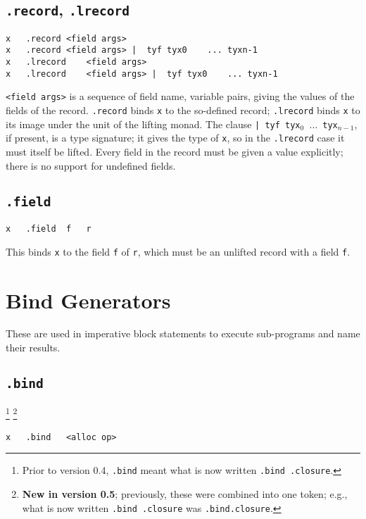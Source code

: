 \documentclass{report}
\newcommand\stringcode[1]{\texttt{#1}}
\newcommand\old[2]{\footnote{Prior to version #1, #2}}
\newcommand\new[2]{\footnote{\textbf{New in version #1}; previously, #2}}
\begin{document}
\subsection{\stringcode{.record}, \stringcode{.lrecord}}

\begin{verbatim}
x	.record	<field args>
x	.record	<field args> |	tyf	tyx0	...	tyxn-1
x	.lrecord	<field args>
x	.lrecord	<field args> |	tyf	tyx0	...	tyxn-1
\end{verbatim}

\stringcode{<field args>} is a sequence of field name, variable pairs, giving the values of the fields of the record.
\stringcode{.record} binds \stringcode{x} to the so-defined record;
\stringcode{.lrecord} binds \stringcode{x} to its image under the unit of the lifting monad.
The clause \stringcode{| tyf tyx$_0$ $\ldots$ tyx$_{n-1}$}, if present, is a type signature;
it gives the type of \stringcode{x}, so in the \stringcode{.lrecord} case it must itself be lifted.
Every field in the record must be given a value explicitly; there is no support for undefined fields.

\subsection{\stringcode{.field}}

\begin{verbatim}
x	.field	f	r
\end{verbatim}

This binds \stringcode{x} to the field \stringcode{f} of \stringcode{r}, which must be an unlifted record with a field \stringcode{f}.

\section{Bind Generators}
\label{bind}

These are used in imperative block statements to execute sub-programs and name their results.

\subsection{\stringcode{.bind}}
\old{0.4}{\stringcode{.bind} meant what is now written \stringcode{.bind	.closure}.}
\new{0.5}{these were combined into one token; e.g., what is now written \stringcode{.bind	.closure} was \stringcode{.bind.closure}.}

\begin{verbatim}
x	.bind	<alloc op>
\end{verbatim}
\end{document}
